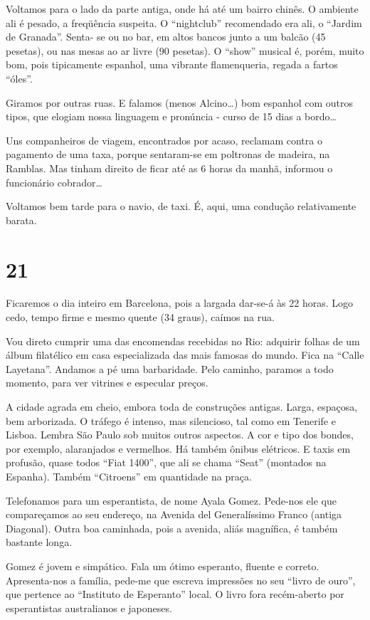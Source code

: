 Voltamos para o lado da parte antiga, onde há até um bairro chinês. O ambiente ali é pesado, a freqüência suspeita. O “nightclub” recomendado era ali, o “Jardim de Granada”. Senta- se ou no bar, em altos bancos junto a um balcão (45 pesetas), ou nas mesas ao ar livre (90 pesetas). O “show” musical é, porém, muito bom, pois tipicamente espanhol, uma vibrante flamenqueria, regada a fartos “óles”.

Giramos por outras ruas. E falamos (menos Alcino\ldots) bom espanhol com outros tipos, que elogiam nossa linguagem e pronúncia - curso de 15 dias a bordo\ldots

Uns companheiros de viagem, encontrados por acaso, reclamam contra o pagamento de uma taxa, porque sentaram-se em poltronas de madeira, na Ramblas. Mas tinham direito de ficar até as 6 horas da manhã, informou o funcionário cobrador\ldots

Voltamos bem tarde para o navio, de taxi. É, aqui, uma condução relativamente barata.

\section*{21 \adfflatleafright {}}

Ficaremos o dia inteiro em Barcelona, pois a largada dar-se-á às 22 horas. Logo cedo, tempo firme e mesmo quente (34 graus), caímos na rua.

Vou direto cumprir uma das encomendas recebidas no Rio: adquirir folhas de um álbum filatélico em casa especializada das mais famosas do mundo. Fica na “Calle Layetana”. Andamos a pé uma barbaridade. Pelo caminho, paramos a todo momento, para ver vitrines e especular preços.

A cidade agrada em cheio, embora toda de construções antigas. Larga, espaçosa, bem arborizada. O tráfego é intenso, mas silencioso, tal como em Tenerife e Lisboa. Lembra São Paulo sob muitos outros aspectos. A cor e tipo dos bondes, por exemplo, alaranjados e vermelhos. Há também ônibus elétricos. E taxis em profusão, quase todos “Fiat 1400”, que ali se chama “Seat” (montados na Espanha). Também “Citroens” em quantidade na praça.

Telefonamos para um esperantista, de nome Ayala Gomez. Pede-nos ele que compareçamos ao seu endereço, na Avenida del Generalíssimo Franco (antiga Diagonal). Outra boa caminhada, pois a avenida, aliás magnífica, é também bastante longa.

Gomez é jovem e simpático. Fala um ótimo esperanto, fluente e correto. Apresenta-nos a família, pede-me que escreva impressões no seu “livro de ouro”, que pertence ao “Instituto de Esperanto” local. O livro fora recém-aberto por esperantistas australianos e japoneses.

